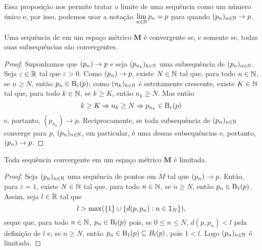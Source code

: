 Essa proposição nos permite tratar o limite de uma sequência como um número único e, por isso, podemos usar a notação $\displaystyle\lim_{n \in \mathbb{N}} p_n = p$ para quando $(p_n)_{n \in \mathbb{N}} \rightarrow p$.

\begin{prop}
Uma sequência de em um espaço métrico $\bm M$ é convergente se, e somente se, todas suas subsequências são convergentes.
\end{prop}
\begin{proof}
	Suponhamos que $(p_n) \rightarrow p$ e seja $(p_{n_k})_{k \in \mathbb{N}}$ uma subsequência de $(p_n)_{n \in \mathbb{N}}$. Seja $\varepsilon \in \mathbb{R}$ tal que $\varepsilon > 0$. Como $(p_n) \rightarrow p$, existe $N \in \mathbb{N}$ tal que, para todo $n \in \mathbb{N}$, se $n \geq N$, então $p_n \in \mathrm{B}_\varepsilon(p)$; como $(n_k)_{k \in \mathbb{N}}$ é estritamente crescente, existe $K \in \mathbb{N}$ tal que, para todo $k \in \mathbb{N}$, se $k \geq K$, então $n_k \geq N$. Mas então
	\begin{equation*}
	k \geq K \Rightarrow n_k \geq N \Rightarrow p_{n_k} \in \mathrm{B}_\varepsilon(p)
	\end{equation*}
e, portanto, $(p_{n_k}) \to p$.	Reciprocamente, se toda subsequência de $(p_n)_{n \in \mathbb{N}}$ converge para $p$, $(p_n)_{n \in \mathbb{N}}$, em particular, é uma dessas subsequências e, portanto, $(p_n) \rightarrow p$.
\end{proof}

\begin{prop}
Toda sequência convergente em um espaço métrico $\bm M$ é limitada.
\end{prop}
\begin{proof}
	Seja $(p_n)_{n \in \mathbb{N}}$ uma sequência de pontos em $M$ tal que $(p_n) \rightarrow p$. Então, para $\varepsilon = 1$, existe $N \in \mathbb{N}$ tal que, para todo $n \in \mathbb{N}$, se $n \geq N$, então $p_n \in \mathrm{B}_1(p)$. Assim, seja $l \in \mathbb{R}$ tal que
	\begin{equation*}
	l > \max(\{1\} \cup \{d(p,p_n) : n \in \mathtt I_N\}),
	\end{equation*}
seque que, para todo $n \in \mathbb{N}$, $p_n \in \mathrm{B}_l(p)$ pois, se $0 \leq n \leq N$, $d(p,p_n) < l$ pela definição de $l$ e, se $n \geq N$, então $p_n \in \mathrm{B}_1(p) \subseteq B_l(p)$, pois $1 < l$. Logo $(p_n)_{n \in \mathbb{N}}$ é limitada.
\end{proof}

